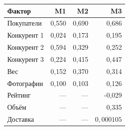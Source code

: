 \begin{tabular}{lrrr}
\toprule
Фактор & M1 & M2 & M3 \\
\midrule
Покупатели & 0,550 & 0,690 & 0,686 \\
Конкурент 1 & 0,024 & 0,173 & 0,195 \\
Конкурент 2 & 0,594 & 0,329 & 0,252 \\
Конкурент 3 & 0,224 & 0,415 & 0,447 \\
Вес & 0,152 & 0,370 & 0,314 \\
Фотографии & 0,100 & 0,103 & 0,126 \\
Рейтинг & --- & --- & -0,029 \\
Объём & --- & --- & 0,335 \\
Доставка & --- & --- & $0{,}000105$ \\
\bottomrule
\end{tabular}
